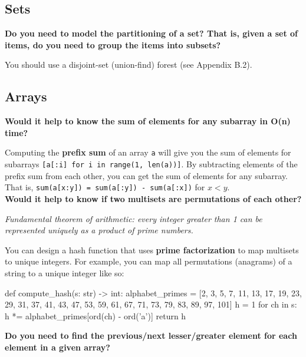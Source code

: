 \documentclass[12pt]{article}
\begin{document}
\subsection*{Sets}

\begin{adjustwidth}{2em}{0pt}
\textbf{Do you need to model the partitioning of a set? That is, given a set of items, do you need to group the items into subsets?} \medskip

You should use a disjoint-set (union-find) forest (see Appendix B.2).
\end{adjustwidth}

\subsection*{Arrays}

\begin{adjustwidth}{2em}{0pt}
\textbf{Would it help to know the sum of elements for any subarray in O(n) time?} \medskip

Computing the \textbf{prefix sum} of an array \texttt{a} will give you the sum of elements for subarrays \texttt{[a[:i] for i in range(1, len(a))]}. By subtracting elements of the prefix sum from each other, you can get the sum of elements for any subarray. That is, \texttt{sum(a[x:y]) = sum(a[:y]) - sum(a[:x])} for $x < y$. \\

\textbf{Would it help to know if two multisets are permutations of each other?} \medskip

\textit{Fundamental theorem of arithmetic: every integer greater than 1 can be represented uniquely as a product of prime numbers.} \medskip

You can design a hash function that uses \textbf{prime factorization} to map multisets to unique integers. For example, you can map all permutations (anagrams) of a string to a unique integer like so: \medskip

\begin{python}
def compute_hash(s: str) -> int:
    alphabet_primes = [2, 3, 5, 7, 11, 13, 17, 19, 23, 29,
                       31, 37, 41, 43, 47, 53, 59, 61, 67,
                       71, 73, 79, 83, 89, 97, 101]
    h = 1
    for ch in s:
        h *= alphabet_primes[ord(ch) - ord('a')]
    return h
\end{python} \bigskip

\textbf{Do you need to find the previous/next lesser/greater element for each element in a given array?} \medskip


\end{adjustwidth}
\end{document}

